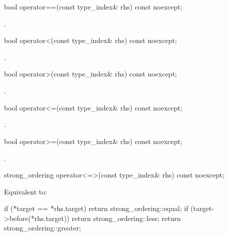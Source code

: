 %
\begin{itemdecl}
bool operator==(const type_index& rhs) const noexcept;
\end{itemdecl}

\begin{itemdescr}
\pnum
\returns
{}.
\end{itemdescr}

%
\begin{itemdecl}
bool operator<(const type_index& rhs) const noexcept;
\end{itemdecl}

\begin{itemdescr}
\pnum
\returns
{}.
\end{itemdescr}

%
\begin{itemdecl}
bool operator>(const type_index& rhs) const noexcept;
\end{itemdecl}

\begin{itemdescr}
\pnum
\returns
{}.
\end{itemdescr}

%
\begin{itemdecl}
bool operator<=(const type_index& rhs) const noexcept;
\end{itemdecl}

\begin{itemdescr}
\pnum
\returns
{}.
\end{itemdescr}

%
\begin{itemdecl}
bool operator>=(const type_index& rhs) const noexcept;
\end{itemdecl}

\begin{itemdescr}
\pnum
\returns
{}.
\end{itemdescr}

%
\begin{itemdecl}
strong_ordering operator<=>(const type_index& rhs) const noexcept;
\end{itemdecl}

\begin{itemdescr}
\pnum
\effects
Equivalent to:
\begin{codeblock}
if (*target == *rhs.target) return strong_ordering::equal;
if (target->before(*rhs.target)) return strong_ordering::less;
return strong_ordering::greater;
\end{codeblock}
\end{itemdescr}

